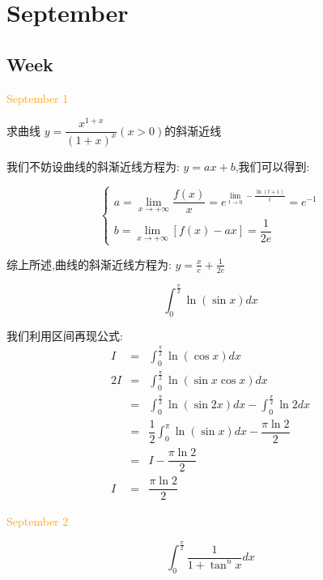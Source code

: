 \chapter{September}
\section{Week }
\textcolor{orange}{September 1}

\begin{example}[][Exam: 35.1.1]
	求曲线 $y=\dfrac{x^{1+x}}{(1+x)^x}(x>0)$的斜渐近线
\end{example}

\begin{solution}

	我们不妨设曲线的斜渐近线方程为:  $y=ax+b$,我们可以得到:  
	
	$$\left\lbrace
	\begin{array}{l}
		a=\lim\limits_{x\to +\infty}\dfrac{f(x)}{x}=e^{\lim\limits_{t\to 0}-\frac{\ln(t+1)}{t}}=e^{-1}\\
		b=\lim\limits_{x\to +\infty}[f(x)-ax]=\dfrac{1}{2e}
	\end{array}
	\right. $$
	
	综上所述,曲线的斜渐近线方程为:  $y=\frac{x}{e}+\frac{1}{2e}$
\end{solution}

\begin{example}[][Exam: 35.1.2]
	$$\int_{0}^{\frac{\pi}{2}}\ln(\sin x)dx$$
\end{example}

\begin{solution}

	我们利用区间再现公式:  
	\begin{eqnarray*}
		I&=&\int_{0}^{\frac{\pi}{2}}\ln(\cos x)dx\\
		2I&=&\int_{0}^{\frac{\pi}{2}}\ln(\sin x\cos x)dx\\
		&=&\int_{0}^{\frac{\pi}{2}}\ln(\sin 2x)dx-\int_{0}^{\frac{\pi}{2}}\ln2dx\\
		&=&\dfrac{1}{2}\int_{0}^{\pi}\ln(\sin x)dx-\dfrac{\pi \ln 2}{2}\\
		&=&I-\dfrac{\pi \ln 2}{2}\\
		I&=&\dfrac{\pi \ln 2}{2}
	\end{eqnarray*}
\end{solution}


\textcolor{orange}{September 2}

\begin{example}[][Exam: 35.1.3]
	$$\int_{0}^{\frac{\pi}{2}}\dfrac{1}{1+\tan^{n}x}dx$$
\end{example}

